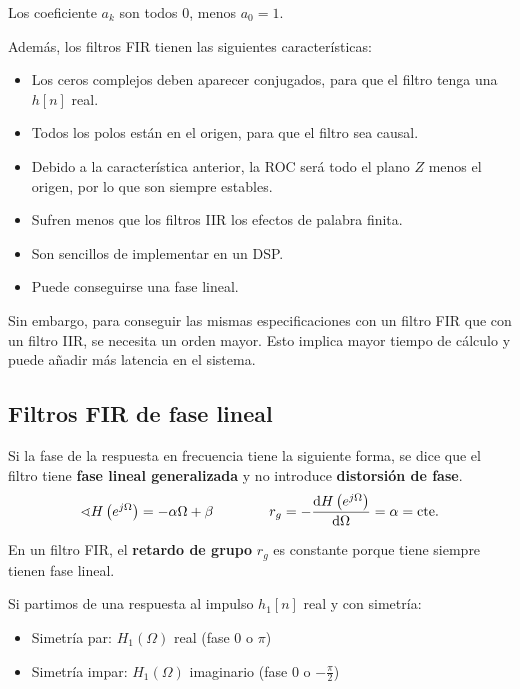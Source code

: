 \documentclass[a4paper,oneside]{book}
\begin{document}
Los coeficiente $a_k$ son todos 0, menos $a_0 = 1$.

Además, los filtros FIR tienen las siguientes características:
\begin{itemize}
	\item Los ceros complejos deben aparecer conjugados, para que el filtro tenga una $h[n]$ real.
	\item Todos los polos están en el origen, para que el filtro sea causal.
	\item Debido a la característica anterior, la ROC será todo el plano $Z$ menos el origen, por lo que son siempre estables.
	\item Sufren menos que los filtros IIR los efectos de palabra finita.
	\item Son sencillos de implementar en un DSP.
	\item Puede conseguirse una fase lineal.
\end{itemize}

Sin embargo, para conseguir las mismas especificaciones con un filtro FIR que con un filtro IIR, se necesita un orden mayor. Esto implica mayor tiempo de cálculo y puede añadir más latencia en el sistema.

\subsection{Filtros FIR de fase lineal}

Si la fase de la respuesta en frecuencia tiene la siguiente forma, se dice que el filtro tiene \textbf{fase lineal generalizada} y no introduce \textbf{distorsión de fase}.
\[ \sphericalangle H \left( e^{j\Omega} \right) = -\alpha \Omega + \beta \qquad \qquad r_g = -\dv{H \left( e^{j\Omega} \right)}{\Omega} = \alpha = \text{cte.} \]

En un filtro FIR, el \textbf{retardo de grupo} $r_g$ es constante porque tiene siempre tienen fase lineal.

Si partimos de una respuesta al impulso $h_1[n]$ real y con simetría:
\begin{itemize}
	\item Simetría par: $H_1(\Omega )$ real (fase 0 o $\pi$)
	\item Simetría impar: $H_1(\Omega )$ imaginario (fase 0 o $-\frac{\pi}{2}$)
\end{itemize}
\end{document}
